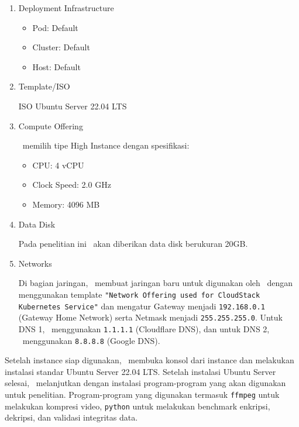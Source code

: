 \begin{enumerate}
    \item Deployment Infrastructure
          \begin{itemize}
              \item Pod: Default
              \item Cluster: Default
              \item Host: Default
          \end{itemize}

    \item Template/ISO

          ISO Ubuntu Server 22.04 LTS

    \item Compute Offering

          \saya\ memilih tipe High Instance dengan spesifikasi:
          \begin{itemize}
              \item CPU: 4 vCPU
              \item Clock Speed: 2.0 GHz
              \item Memory: 4096 MB
          \end{itemize}

    \item Data Disk

          Pada penelitian ini \vm\ akan diberikan data disk berukuran 20GB.

    \item Networks

          Di bagian jaringan, \saya\ membuat jaringan baru untuk digunakan oleh \vm\ dengan menggunakan template \texttt{"Network Offering used for CloudStack Kubernetes Service"} dan mengatur Gateway menjadi \texttt{192.168.0.1} (Gateway Home Network) serta Netmask menjadi \texttt{255.255.255.0}. Untuk DNS 1, \saya\ menggunakan \texttt{1.1.1.1} (Cloudflare DNS), dan untuk DNS 2, \saya\ menggunakan \texttt{8.8.8.8} (Google DNS).
\end{enumerate}

Setelah instance siap digunakan, \saya\ membuka konsol dari instance dan melakukan instalasi standar Ubuntu Server 22.04 LTS. Setelah instalasi Ubuntu Server selesai, \saya\ melanjutkan dengan instalasi program-program yang akan digunakan untuk penelitian. Program-program yang digunakan termasuk \texttt{ffmpeg} untuk melakukan kompresi video, \texttt{python} untuk melakukan benchmark enkripsi, dekripsi, dan validasi integritas data.

